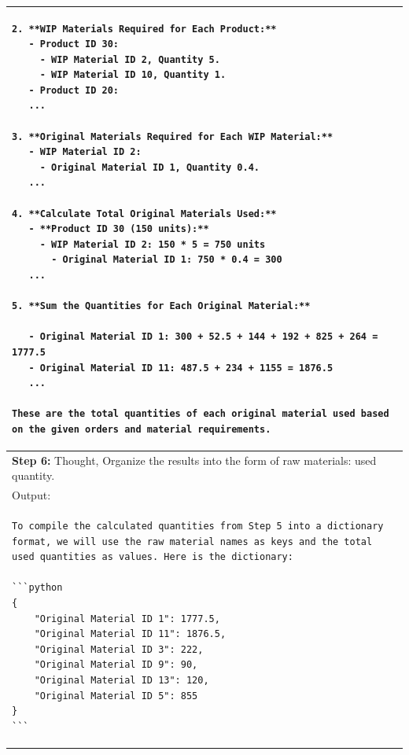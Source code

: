 \documentclass[preprint,12pt]{elsarticle}
\begin{document}
\begin{center}
\begin{longtable}{p{390pt}}
\begin{lstlisting}[style=sql_command]
2. **WIP Materials Required for Each Product:**
   - Product ID 30:
     - WIP Material ID 2, Quantity 5.
     - WIP Material ID 10, Quantity 1.
   - Product ID 20:
   ...
   
3. **Original Materials Required for Each WIP Material:**
   - WIP Material ID 2:
     - Original Material ID 1, Quantity 0.4.
   ...
     
4. **Calculate Total Original Materials Used:**
   - **Product ID 30 (150 units):**
     - WIP Material ID 2: 150 * 5 = 750 units
       - Original Material ID 1: 750 * 0.4 = 300
   ...
   
5. **Sum the Quantities for Each Original Material:**

   - Original Material ID 1: 300 + 52.5 + 144 + 192 + 825 + 264 = 1777.5
   - Original Material ID 11: 487.5 + 234 + 1155 = 1876.5
   ...

These are the total quantities of each original material used based on the given orders and material requirements.
\end{lstlisting}\\ \hline
\textbf{Step 6:} Thought, Organize the results into the form of {raw materials: used quantity}.\\
Output:\\
\begin{lstlisting}[style=sql_command]
To compile the calculated quantities from Step 5 into a dictionary format, we will use the raw material names as keys and the total used quantities as values. Here is the dictionary:

```python
{
    "Original Material ID 1": 1777.5,
    "Original Material ID 11": 1876.5,
    "Original Material ID 3": 222,
    "Original Material ID 9": 90,
    "Original Material ID 13": 120,
    "Original Material ID 5": 855
}
```
\end{lstlisting}\\ \hline
\end{longtable}
\end{center}
\end{document}
